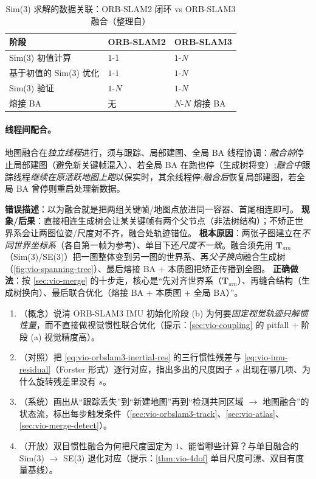 \begin{table}[H]\centering\small
\caption{Sim(3) 求解的数据关联：ORB-SLAM2 闭环 vs ORB-SLAM3 融合（整理自\cite{campos2021orbslam3}）}
\label{tab:vio-merge-stages}
\begin{tabular}{lll}
\toprule
阶段 & ORB-SLAM2 & ORB-SLAM3 \\
\midrule
Sim(3) 初值计算 & $1$-$1$ & $1$-$N$ \\
基于初值的 Sim(3) 优化 & $1$-$1$ & $1$-$N$ \\
Sim(3) 验证 & $1$-$N$ & $1$-$N$ \\
熔接 BA & 无 & $N$-$N$ 熔接 BA \\
\bottomrule
\end{tabular}
\end{table}

\paragraph{线程间配合。}
地图融合在\emph{独立线程}进行，须与跟踪、局部建图、全局 BA 线程协调\cite{campos2021orbslam3}：\emph{融合前}停止局部建图（避免新关键帧混入）、若全局 BA 在跑也停（生成树将变）;\emph{融合中}跟踪线程\emph{继续在原活跃地图上跑}以保实时，其余线程停;\emph{融合后}恢复局部建图，若全局 BA 曾停则重启处理新数据。

\begin{pitfall}[概念误区：地图融合 = 把两张图“拼”在一起]
\textbf{错误描述}：以为融合就是把两组关键帧/地图点放进同一容器、首尾相连即可。
\textbf{现象/后果}：直接相连生成树会让某关键帧有两个父节点（非法树结构）；不矫正世界系会让两图位姿/尺度对不齐，融合处轨迹错位。
\textbf{根本原因}：两张子图建立在\emph{不同世界坐标系}（各自第一帧为参考）、单目下还\emph{尺度不一致}。融合须先用 $\mathbf{T}_{am}$（Sim(3)/SE(3)）把一图整体变到另一图的世界系、再\emph{父子换向}融合生成树（\cref{fig:vio-spanning-tree}）、最后熔接 BA $+$ 本质图把矫正传播到全图。
\textbf{正确做法}：按 \cref{sec:vio-merge} 的十步走，核心是“先对齐世界系（$\mathbf{T}_{am}$）、再缝合结构（生成树换向）、最后联合优化（熔接 BA $+$ 本质图 $+$ 全局 BA）”。
\end{pitfall}

\begin{practice}
\begin{enumerate}
  \item （概念）说清 ORB-SLAM3 IMU 初始化阶段 (b) 为何要\emph{固定视觉轨迹只解惯性量}，而不直接做视觉惯性联合优化（提示：\cref{sec:vio-coupling} 的 pitfall $+$ 阶段 (a) 视觉精度高）。
  \item （对照）把 \cref{eq:vio-orbslam3-inertial-res} 的三行惯性残差与 \cref{eq:vio-imu-residual}（Forster 形式）逐行对应，指出多出的尺度因子 $s$ 出现在哪几项、为什么旋转残差里没有 $s$。
  \item （系统）画出从“跟踪丢失”到“新建地图”再到“检测共同区域 $\to$ 地图融合”的状态流，标出每步触发条件（\cref{sec:vio-orbslam3-track}、\cref{sec:vio-atlas}、\cref{sec:vio-merge-detect}）。
  \item （开放）双目惯性融合为何把尺度固定为 $1$、能省哪些计算？与单目融合的 Sim(3) $\to$ SE(3) 退化对应（提示：\cref{thm:vio-4dof} 单目尺度可漂、双目有度量基线）。
\end{enumerate}
\end{practice}

